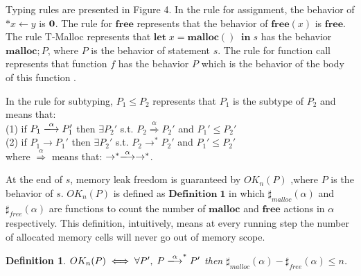 \documentclass[english]{jssst_ppl} %
\newcommand\LET{\mathbf{let}\;}
\newcommand\IN{\mathbf{in}\;}
\newcommand\MALLOC{\mathbf{malloc()}\;}
\newcommand\Malloc{\mathbf{malloc}}
\newcommand\Free{\mathbf{free}}
\newcommand\Cirx{(x)}
\newtheorem{myDef}{Definition}
\theoremstyle{definition}
\begin{document}
Typing rules are presented in Figure 4. In the rule for assignment, the behavior of  $*x \leftarrow y$ is $\bf 0$. The rule for $\Free$ represents that the behavior of $\Free \Cirx$ is $\Free$. The rule T-Malloc represents that $\LET x = \MALLOC \; \IN s$ has the behavior $\Malloc;P$, where $P$ is the behavior of statement $s$. The rule for function call represents that function $f$ has the behavior $P$ which is the behavior of the body of this function .

In the rule for subtyping, $P_{1} \le P_{2}$ represents that $P_{1}$ is the subtype of $P_{2}$ and  means that: \\
(1) if $P_{1} \xlongrightarrow{\alpha}  P_{1}'$ then $\exists P_{2}' $ s.t. $P_{2} \overset{\text{$\alpha$}}{\Longrightarrow} P_{2}'$ and $ P_{1}' \le P_{2}' $\\
(2) if $P_{1} \rightarrow P_{1}'$ then $\exists P_{2}'$ s.t. $P_{2} \rightarrow^{*} P_{2}'$ and  $P_{1}' \le P_{2}'$\\
where $\overset{\text{$\alpha$}}{\Longrightarrow}$ means that: $\rightarrow^{*} \xlongrightarrow{\alpha} \rightarrow^{*}$.

At the end of $s$, memory leak freedom is guaranteed by $OK_{n}(P)$ ,where $P$ is the behavior of $s$. $OK_{n}(P)$ is defined as $\mathbf{Definition\; 1}$ in which $\sharp_{malloc}(\alpha)$ and $\sharp_{free}(\alpha)$ are functions to count the number of $\Malloc$ and $\Free$ actions in $\alpha$ respectively. This definition, intuitively, means at every running step the number of allocated memory cells will never go out of memory scope.
\begin{myDef}
 $OK_{n}(P) \iff \forall P',\; P \xlongrightarrow{\alpha}^{*}P'$ then $\sharp_{malloc}(\alpha)-\sharp_{free}(\alpha)\le n$.
\end{myDef}
\end{document}

